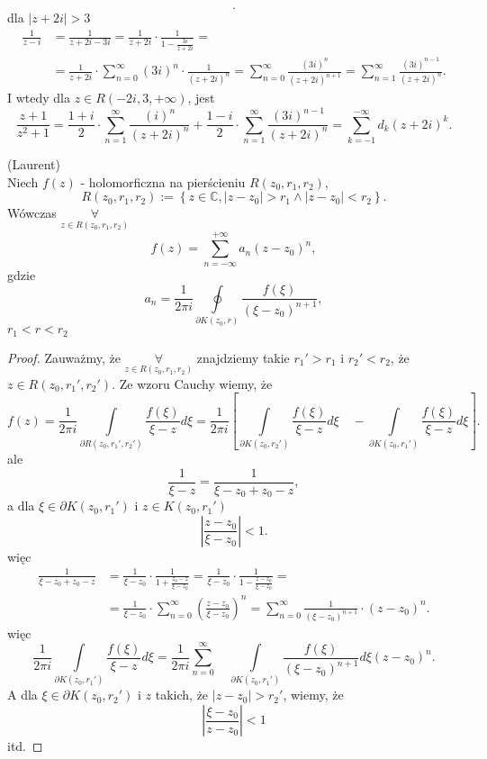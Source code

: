 \documentclass[../main.tex]{subfiles}
\begin{document}
\begin{przyklad}
\[.\]
dla $|z+2i| > 3$
\begin{align*}
    \frac{1}{z-i} &= \frac{1}{z+2i-3i} = \frac{1}{z+2i}\cdot \frac{1}{1 - \frac{3i}{z+2i}} =\\
    &= \frac{1}{z+2i}\cdot \sum_{n=0}^{\infty} (3i)^n\cdot \frac{1}{(z+2i)^n} = \sum_{n=0}^{\infty} \frac{(3i)^n}{(z+2i)^{n+1}} = \sum_{n=1}^{\infty} \frac{(3i)^{n-1}}{(z+2i)^n}
.\end{align*}
I wtedy dla $z\in R(-2i,3,+\infty)$, jest
\[
    \frac{z+1}{z^2+1} = \frac{1+i}{2} \cdot \sum_{n=1}^{\infty} \frac{(i)^n}{(z+2i)^n} + \frac{1-i}{2}\cdot \sum_{n=1}^{\infty} \frac{(3i)^{n-1}}{(z+2i)^n} = \sum_{k=-1}^{-\infty} d_k (z+2i)^k
.\]
\end{przyklad}
\begin{tw}
    (Laurent)\\
    Niech $f(z)$ - holomorficzna na pierścieniu $R(z_0,r_1,r_2)$,
    \[
        R(z_0,r_1,r_2) := \left\{ z\in\mathbb{C}, |z-z_0|>r_1 \land |z-z_0| < r_2 \right\}
    .\]
Wówczas $\underset{z\in R(z_0,r_1,r_2)}{\forall} $
\[
    f(z) = \sum_{n=-\infty}^{+\infty} a_n(z-z_0)^n
,\]
gdzie
\[
    a_n = \frac{1}{2\pi i} \oint\limits_{\partial K(z_0,r)} \frac{f(\xi)}{(\xi - z_0)^{n+1}}
,\]
$r_1<r<r_2$
\end{tw}
\begin{proof}
    Zauważmy, że
        $\underset{z\in R(z_0,r_1,r_2)}{\forall}$ znajdziemy takie $r_1' > r_1$ i $r_2' < r_2$, że $z\in R(z_0,r_1',r_2')$. Ze wzoru Cauchy wiemy, że
        \[
            f(z) = \frac{1}{2\pi i } \int\limits_{\partial R(z_0,r_1',r_2')}\frac{f(\xi)}{\xi-z}d\xi = \frac{1}{2\pi i}\left[\int\limits_{\partial K(z_0,r_2')}\frac{f(\xi)}{\xi - z}d\xi \quad- \int\limits_{\partial K(z_0,r_1')} \frac{f(\xi)}{\xi - z}d\xi\right]
        .\]
    ale
    \[
    \frac{1}{\xi - z} = \frac{1}{\xi - z_0 + z_0 - z}
    ,\]
a dla $\xi \in \partial K (z_0,r_1')$ i $z\in K(z_0,r_1')$
\[
    \left|\frac{z-z_0}{\xi-z_0}\right| < 1
.\]
więc
\begin{align*}
    \frac{1}{\xi - z_0 + z_0 - z} &= \frac{1}{\xi - z_0}\cdot \frac{1}{1 + \frac{z_0 - z}{\xi - z_0}} = \frac{1}{\xi - z_0}\cdot \frac{1}{1 - \frac{z-z_0}{\xi - z_0}} =\\
    &=\frac{1}{\xi - z_0}\cdot \sum_{n=0}^{\infty} \left(\frac{z-z_0}{\xi - z_0}\right)^n = \sum_{n=0}^{\infty} \frac{1}{(\xi - z_0)^{n+1}}\cdot (z-z_0)^n
.\end{align*}
więc
\[
    \frac{1}{2 \pi i}\int\limits_{\partial K(z_0,r_1')}\frac{f(\xi)}{\xi - z}d\xi = \frac{1}{2\pi i} \sum_{n=0}^{\infty}\quad \int\limits_{\partial K(z_0,r_1')}\frac{f(\xi)}{(\xi - z_0)^{n+1}}d\xi (z-z_0)^n
    .\]
A dla $\xi\in\partial K(z_0,r_2')$ i $z$ takich, że $|z - z_0| > r_2'$, wiemy, że
\[
    \left|\frac{\xi - z_0}{z - z_0}\right| < 1
\]
itd.
\end{proof}
\end{document}
